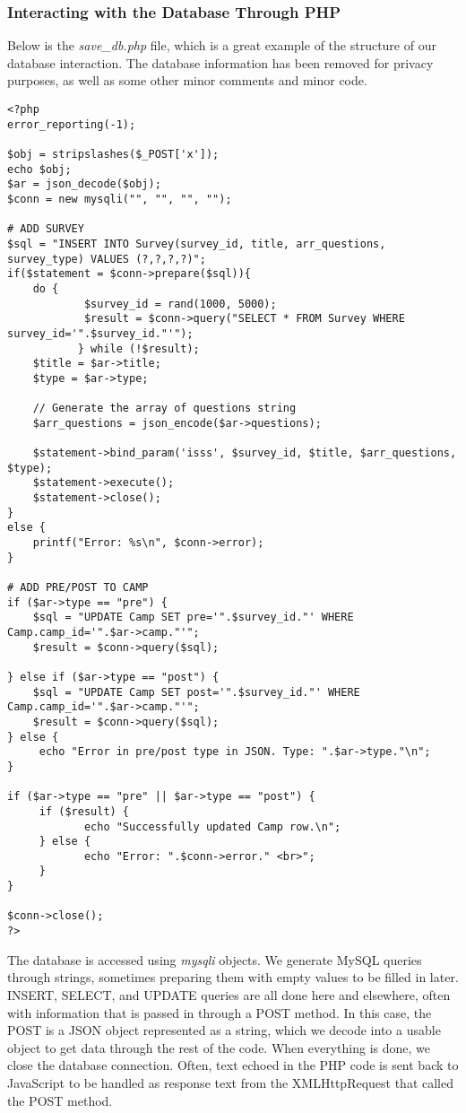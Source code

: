 \documentclass[../final.tex]{subfiles}
\begin{document}
\subsubsection{Interacting with the Database Through PHP}
Below is the \emph{save\_db.php} file, which is a great example of the structure of our database interaction.
The database information has been removed for privacy purposes, as well as some other minor comments and minor code.
\begin{lstlisting}
<?php
error_reporting(-1);

$obj = stripslashes($_POST['x']);
echo $obj;
$ar = json_decode($obj);
$conn = new mysqli("", "", "", "");

# ADD SURVEY
$sql = "INSERT INTO Survey(survey_id, title, arr_questions, survey_type) VALUES (?,?,?,?)";
if($statement = $conn->prepare($sql)){
	do {
           	$survey_id = rand(1000, 5000);
           	$result = $conn->query("SELECT * FROM Survey WHERE survey_id='".$survey_id."'");
           } while (!$result);
	$title = $ar->title;
	$type = $ar->type;

	// Generate the array of questions string
	$arr_questions = json_encode($ar->questions);

	$statement->bind_param('isss', $survey_id, $title, $arr_questions, $type);
	$statement->execute();
	$statement->close();
}
else {
	printf("Error: %s\n", $conn->error);
}

# ADD PRE/POST TO CAMP
if ($ar->type == "pre") {
   	$sql = "UPDATE Camp SET pre='".$survey_id."' WHERE Camp.camp_id='".$ar->camp."'";	
	$result = $conn->query($sql);

} else if ($ar->type == "post") {
   	$sql = "UPDATE Camp SET post='".$survey_id."' WHERE Camp.camp_id='".$ar->camp."'";
   	$result = $conn->query($sql);
} else {
  	 echo "Error in pre/post type in JSON. Type: ".$ar->type."\n";
}

if ($ar->type == "pre" || $ar->type == "post") {
  	 if ($result) {
      		echo "Successfully updated Camp row.\n";
  	 } else {
      		echo "Error: ".$conn->error." <br>";
  	 }
}

$conn->close();
?>
\end{lstlisting}
The database is accessed using \emph{mysqli} objects.
We generate MySQL queries through strings, sometimes preparing them with empty values to be filled in later.
INSERT, SELECT, and UPDATE queries are all done here and elsewhere, often with information that is passed in through a POST method.
In this case, the POST is a JSON object represented as a string, which we decode into a usable object to get data through the rest of the code.
When everything is done, we close the database connection.
Often, text echoed in the PHP code is sent back to JavaScript to be handled as response text from the XMLHttpRequest that called the POST method.
\end{document}
